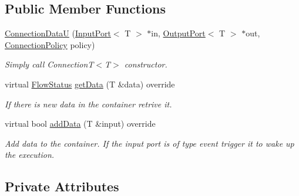 \subsection*{Public Member Functions}
\begin{DoxyCompactItemize}
\item 
\hypertarget{classcoco_1_1_connection_data_u_aa5bf4219967a9deaa4d44aec278091d3}{\hyperlink{classcoco_1_1_connection_data_u_aa5bf4219967a9deaa4d44aec278091d3}{Connection\-Data\-U} (\hyperlink{classcoco_1_1_input_port}{Input\-Port}$<$ T $>$ $\ast$in, \hyperlink{classcoco_1_1_output_port}{Output\-Port}$<$ T $>$ $\ast$out, \hyperlink{structcoco_1_1_connection_policy}{Connection\-Policy} policy)}\label{classcoco_1_1_connection_data_u_aa5bf4219967a9deaa4d44aec278091d3}

\begin{DoxyCompactList}\small\item\em Simply call Connection\-T$<$\-T$>$ constructor. \end{DoxyCompactList}\item 
\hypertarget{classcoco_1_1_connection_data_u_aeef7e32d4fe7512b7ead3d3e069e0462}{virtual \hyperlink{namespacecoco_a057be58377e415c9be98c1dc5c8426ad}{Flow\-Status} \hyperlink{classcoco_1_1_connection_data_u_aeef7e32d4fe7512b7ead3d3e069e0462}{get\-Data} (T \&data) override}\label{classcoco_1_1_connection_data_u_aeef7e32d4fe7512b7ead3d3e069e0462}

\begin{DoxyCompactList}\small\item\em If there is new data in the container retrive it. \end{DoxyCompactList}\item 
\hypertarget{classcoco_1_1_connection_data_u_a886259fe50439a2dc9178cdf18178a42}{virtual bool \hyperlink{classcoco_1_1_connection_data_u_a886259fe50439a2dc9178cdf18178a42}{add\-Data} (T \&input) override}\label{classcoco_1_1_connection_data_u_a886259fe50439a2dc9178cdf18178a42}

\begin{DoxyCompactList}\small\item\em Add data to the container. If the input port is of type event trigger it to wake up the execution. \end{DoxyCompactList}\end{DoxyCompactItemize}
\subsection*{Private Attributes}
